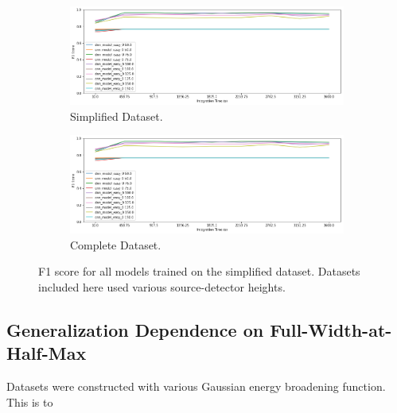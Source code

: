 \begin{figure}[H]
     \centering
     \begin{subfigure}[b]{0.9\textwidth}
         \centering
         \includegraphics[width=\textwidth]{images/results_easy_distance_comparison}
         \caption{Simplified Dataset.}
         \label{fig:results_easy_distance_comparison_simple}
     \end{subfigure}

     \begin{subfigure}[b]{0.9\textwidth}
         \centering
         \includegraphics[width=\textwidth]{images/results_easy_distance_comparison}
         \caption{Complete Dataset.}
         \label{fig:results_easy_distance_comparison_full}
     \end{subfigure}
        \caption{F1 score for all models trained on the simplified dataset. Datasets included here used various source-detector heights.}
        \label{fig:results_easy_distance_comparison}
\end{figure}



\subsection{Generalization Dependence on Full-Width-at-Half-Max}

Datasets were constructed with various Gaussian energy broadening function. This is to 

